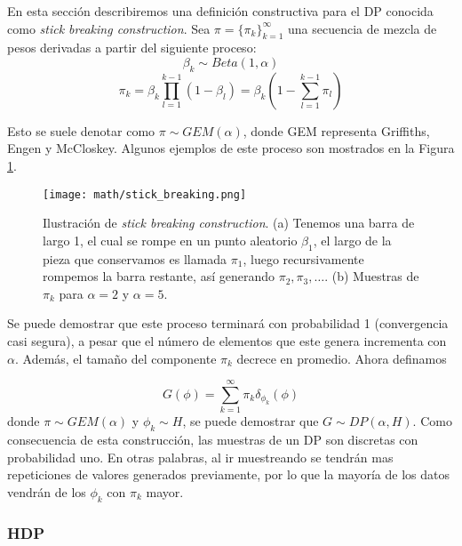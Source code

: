 \documentclass[letterpaper,12pt,oneside]{book} %
\begin{document}
En esta sección describiremos una definición constructiva para el DP conocida como \textit{stick breaking construction}. Sea $\pi=\{\pi_{k}\}_{k=1}^{\infty}$ una secuencia de mezcla de pesos derivadas a partir del siguiente proceso:
\begin{equation}
    \beta_{k}\sim Beta(1, \alpha)
\end{equation}
\begin{equation}
    \pi_{k} = \beta_{k}\prod_{l=1}^{k-1}(1-\beta_{l}) = \beta_{k}(1-\sum_{l=1}^{k-1}\pi_{l})
\end{equation}

Esto se suele denotar como $\pi \sim GEM(\alpha)$, donde GEM representa Griffiths, Engen y McCloskey. Algunos ejemplos de este proceso son mostrados en la Figura \ref{img:stick_breaking}.

\begin{figure}
    \centering
    \texttt{[image: math/stick\_breaking.png]}
    \caption{Ilustración de \textit{stick breaking construction}. (a) Tenemos una barra de largo 1, el cual se rompe en un punto aleatorio $\beta_{1}$, el largo de la pieza que conservamos es llamada $\pi_{1}$, luego recursivamente rompemos la barra restante, así generando $\pi_{2}, \pi_{3}, \ldots$. (b) Muestras de $\pi_{k}$ para $\alpha=2$ y $\alpha=5$.}
    \label{img:stick_breaking}
\end{figure}

Se puede demostrar que este proceso terminará con probabilidad 1 (convergencia casi segura), a pesar que el número de elementos que este genera incrementa con $\alpha$. Además, el tamaño del componente $\pi_{k}$ decrece en promedio.
Ahora definamos

\begin{equation}
    G(\phi) = \sum_{k=1}^{\infty}\pi_{k}\delta_{\phi_{k}}(\phi)
\end{equation}
donde $\pi \sim GEM(\alpha)$ y $\phi_{k} \sim H$, se puede demostrar que $G \sim DP(\alpha, H)$. Como consecuencia de esta construcción, las muestras de un DP son discretas con probabilidad uno. En otras palabras, al ir muestreando se tendrán mas repeticiones de valores generados previamente, por lo que la mayoría de los datos vendrán de los $\phi_{k}$ con $\pi_{k}$ mayor.

\subsubsection{HDP}
\end{document}
